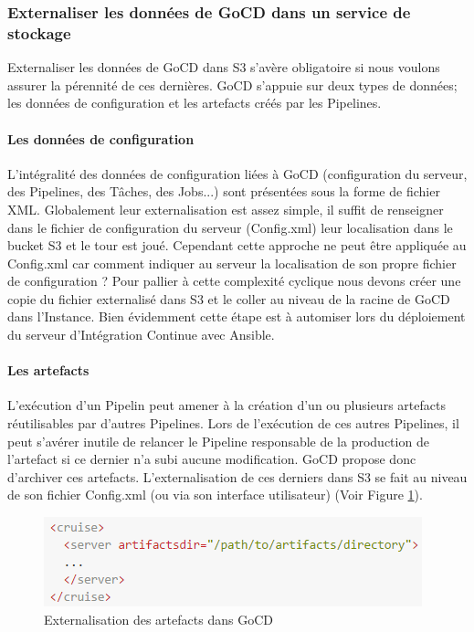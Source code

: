         \subsubsection{Externaliser les données de GoCD dans un service de stockage}
        Externaliser les données de GoCD dans S3 s'avère obligatoire si nous voulons assurer la pérennité de ces dernières. GoCD s'appuie sur deux types de données; les données de configuration et les artefacts créés par les Pipelines.

          \paragraph{Les données de configuration} L'intégralité des données de configuration liées à GoCD (configuration du serveur, des Pipelines, des Tâches, des Jobs...) sont présentées sous la forme de fichier XML. Globalement leur externalisation est assez simple, il suffit de renseigner dans le fichier de configuration du serveur (Config.xml) leur localisation dans le bucket S3 et le tour est joué. Cependant cette approche ne peut être appliquée au Config.xml car comment indiquer au serveur la localisation de son propre fichier de configuration ? Pour pallier à cette complexité cyclique nous devons créer une copie du fichier externalisé dans S3 et le coller au niveau de la racine de GoCD dans l'Instance. Bien évidemment cette étape est à automiser lors du déploiement du serveur d'Intégration Continue avec Ansible.

          \paragraph{Les artefacts} L'exécution d'un Pipelin peut amener à la création d'un ou plusieurs artefacts réutilisables par d'autres Pipelines. Lors de l'exécution de ces autres Pipelines, il peut s'avérer inutile de relancer le Pipeline responsable de la production de l'artefact si ce dernier n'a subi aucune modification. GoCD propose donc d'archiver ces artefacts. L'externalisation de ces derniers dans S3 se fait au niveau de son fichier Config.xml (ou via son interface utilisateur) (Voir Figure \ref{ArtifactsDir}).\\

          \begin{figure}
            \begin{center}
              \includegraphics[scale=0.7]{images/ArtifactsDir.png}
            \end{center}
            \caption{Externalisation des artefacts dans GoCD}
            \label{ArtifactsDir}
          \end{figure}

